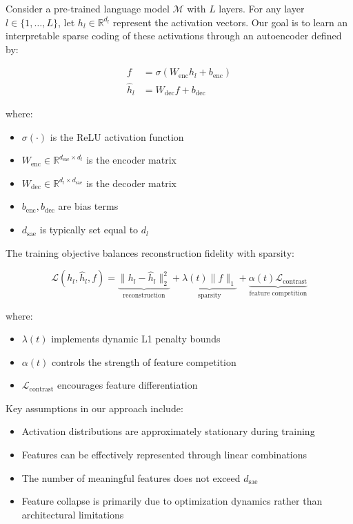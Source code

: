 \documentclass{article} %
\begin{document}
Consider a pre-trained language model $\mathcal{M}$ with $L$ layers. For any layer $l \in \{1,\ldots,L\}$, let $h_l \in \mathbb{R}^{d_l}$ represent the activation vectors. Our goal is to learn an interpretable sparse coding of these activations through an autoencoder defined by:

\begin{align*}
    f &= \sigma(W_{\text{enc}}h_l + b_{\text{enc}}) \\
    \hat{h}_l &= W_{\text{dec}}f + b_{\text{dec}}
\end{align*}

where:
\begin{itemize}
    \item $\sigma(\cdot)$ is the ReLU activation function
    \item $W_{\text{enc}} \in \mathbb{R}^{d_{\text{sae}} \times d_l}$ is the encoder matrix
    \item $W_{\text{dec}} \in \mathbb{R}^{d_l \times d_{\text{sae}}}$ is the decoder matrix
    \item $b_{\text{enc}}, b_{\text{dec}}$ are bias terms
    \item $d_{\text{sae}}$ is typically set equal to $d_l$
\end{itemize}

The training objective balances reconstruction fidelity with sparsity:

\begin{equation}
    \mathcal{L}(h_l, \hat{h}_l, f) = \underbrace{\|h_l - \hat{h}_l\|_2^2}_{\text{reconstruction}} + \underbrace{\lambda(t)\|f\|_1}_{\text{sparsity}} + \underbrace{\alpha(t)\mathcal{L}_{\text{contrast}}}_{\text{feature competition}}
\end{equation}

where:
\begin{itemize}
    \item $\lambda(t)$ implements dynamic L1 penalty bounds
    \item $\alpha(t)$ controls the strength of feature competition
    \item $\mathcal{L}_{\text{contrast}}$ encourages feature differentiation
\end{itemize}

Key assumptions in our approach include:
\begin{itemize}
    \item Activation distributions are approximately stationary during training
    \item Features can be effectively represented through linear combinations
    \item The number of meaningful features does not exceed $d_{\text{sae}}$
    \item Feature collapse is primarily due to optimization dynamics rather than architectural limitations
\end{itemize}
\end{document}

